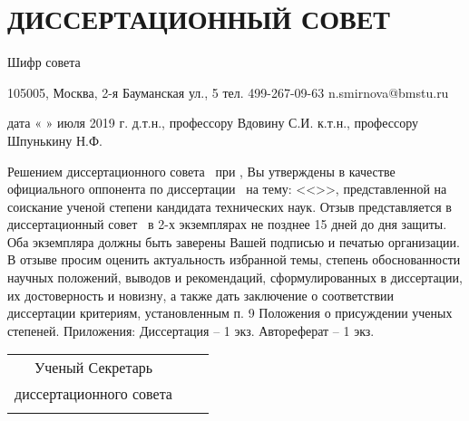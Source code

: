 
\section{ДИССЕРТАЦИОННЫЙ СОВЕТ}



Шифр совета \

105005, Москва,
2-я Бауманская ул., 5
тел. 499-267-09-63
n.smirnova@bmstu.ru

дата «     » июля 2019 г.
д.т.н., профессору Вдовину С.И.
к.т.н., профессору Шпунькину Н.Ф.

Решением диссертационного совета \ при \thesisInOrganization, Вы утверждены в качестве официального оппонента по диссертации \thesisAuthorLastNameFromFull\ на тему: <<\thesisTitle>>, представленной на соискание ученой степени кандидата технических наук.
Отзыв представляется в диссертационный совет \ в 2-х 
экземплярах не позднее 15 дней до дня защиты. Оба экземпляра должны быть заверены Вашей подписью и печатью организации.
В отзыве просим оценить актуальность избранной темы, степень обоснованности научных положений, выводов и рекомендаций, сформулированных в диссертации, их достоверность и новизну, а также дать заключение о соответствии диссертации критериям, установленным п. 9 Положения о присуждении ученых степеней.
Приложения:	Диссертация – 1 экз.
Автореферат – 1 экз.




\begin{center}
	\begin{tabular}[c]{c m{4cm} l}
		   Ученый Секретарь     &            &                     \\
		диссертационного совета & \hrulefill & \dcSecretaryFullFIO \\
		  \dcSecretaryRegalia   &            &
	\end{tabular}
\end{center}



\clearpage